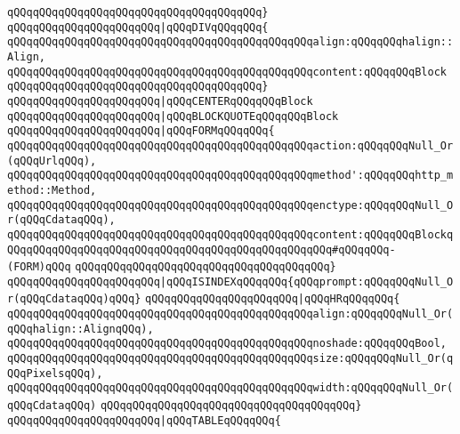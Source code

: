 \verb|qQQqqQQqqQQqqQQqqQQqqQQqqQQqqQQqqQQqqQQq}|\newline
\verb|qQQqqQQqqQQqqQQqqQQqqQQq|\verb#|qQQqDIVqQQqqQQq{#\newline
\verb|qQQqqQQqqQQqqQQqqQQqqQQqqQQqqQQqqQQqqQQqqQQqqQQqalign:qQQqqQQqhalign::Align,|\newline
\verb|qQQqqQQqqQQqqQQqqQQqqQQqqQQqqQQqqQQqqQQqqQQqqQQqcontent:qQQqqQQqBlock|\newline
\verb|qQQqqQQqqQQqqQQqqQQqqQQqqQQqqQQqqQQqqQQq}|\newline
\verb|qQQqqQQqqQQqqQQqqQQqqQQq|\verb#|qQQqCENTERqQQqqQQqBlock#\newline
\verb|qQQqqQQqqQQqqQQqqQQqqQQq|\verb#|qQQqBLOCKQUOTEqQQqqQQqBlock#\newline
\verb|qQQqqQQqqQQqqQQqqQQqqQQq|\verb#|qQQqFORMqQQqqQQq{#\newline
\verb|qQQqqQQqqQQqqQQqqQQqqQQqqQQqqQQqqQQqqQQqqQQqqQQqaction:qQQqqQQqNull_Or(qQQqUrlqQQq),|\newline
\verb|qQQqqQQqqQQqqQQqqQQqqQQqqQQqqQQqqQQqqQQqqQQqqQQqmethod':qQQqqQQqhttp_method::Method,|\newline
\verb|qQQqqQQqqQQqqQQqqQQqqQQqqQQqqQQqqQQqqQQqqQQqqQQqenctype:qQQqqQQqNull_Or(qQQqCdataqQQq),|\newline
\verb|qQQqqQQqqQQqqQQqqQQqqQQqqQQqqQQqqQQqqQQqqQQqqQQqcontent:qQQqqQQqBlockqQQqqQQqqQQqqQQqqQQqqQQqqQQqqQQqqQQqqQQqqQQqqQQqqQQq#qQQqqQQq-(FORM)qQQq|\newline
\verb|qQQqqQQqqQQqqQQqqQQqqQQqqQQqqQQqqQQqqQQq}|\newline
\verb|qQQqqQQqqQQqqQQqqQQqqQQq|\verb#|qQQqISINDEXqQQqqQQq{qQQqprompt:qQQqqQQqNull_Or(qQQqCdataqQQq)qQQq}#\newline
\verb|qQQqqQQqqQQqqQQqqQQqqQQq|\verb#|qQQqHRqQQqqQQq{#\newline
\verb|qQQqqQQqqQQqqQQqqQQqqQQqqQQqqQQqqQQqqQQqqQQqqQQqalign:qQQqqQQqNull_Or(qQQqhalign::AlignqQQq),|\newline
\verb|qQQqqQQqqQQqqQQqqQQqqQQqqQQqqQQqqQQqqQQqqQQqqQQqnoshade:qQQqqQQqBool,|\newline
\verb|qQQqqQQqqQQqqQQqqQQqqQQqqQQqqQQqqQQqqQQqqQQqqQQqsize:qQQqqQQqNull_Or(qQQqPixelsqQQq),|\newline
\verb|qQQqqQQqqQQqqQQqqQQqqQQqqQQqqQQqqQQqqQQqqQQqqQQqwidth:qQQqqQQqNull_Or(qQQqCdataqQQq)|\newline
\verb|qQQqqQQqqQQqqQQqqQQqqQQqqQQqqQQqqQQqqQQq}|\newline
\verb|qQQqqQQqqQQqqQQqqQQqqQQq|\verb#|qQQqTABLEqQQqqQQq{#\newline
